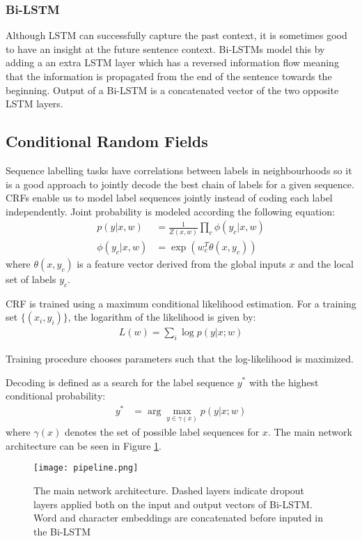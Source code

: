 \subsubsection{Bi-LSTM}
Although LSTM can successfully capture the past context, it is sometimes good
to have an insight at the future sentence context. Bi-LSTMs model
this by adding a an extra LSTM layer which has a reversed information flow
meaning that the information is propagated from the end of the sentence towards
the beginning. Output of a Bi-LSTM is a concatenated vector of the two opposite
LSTM layers.

\subsection{Conditional Random Fields}
Sequence labelling tasks have correlations between labels in neighbourhoods so
it is a good approach to jointly decode the best chain of labels for a given
sequence. CRFs enable us to model label sequences jointly instead of coding
each label independently. Joint probability is modeled according the following
equation:
\begin{align*}
    p(y | x, w) &= \frac{1}{Z(x, w)} \prod_c \phi(y_c | x, w)\\
    \phi(y_c | x, w) &= \exp(w_c^T \theta(x, y_c))
\end{align*}
where $\theta(x, y_c)$ is a feature vector derived from the global inputs $x$
and the local set of labels $y_c$.

CRF is trained using a maximum conditional likelihood estimation. For a
training set $\{(x_i, y_i)\}$, the logarithm of the likelihood is given by:
\begin{align*}
    L(w) = \sum_i \log p(y | x; w)
\end{align*}

Training procedure chooses parameters such that the log-likelihood is
maximized.

Decoding is defined as a search for the label sequence $y^*$ with the highest
conditional probability:
\begin{align*}
    y^* &= \arg\max\limits_{y \in \gamma(x)} p(y | x; w)
\end{align*}
where $\gamma(x)$ denotes the set of possible label sequences for $x$.
The main network architecture can be seen in Figure \ref{fig:pipeline}.

\begin{figure}
  \caption{The main network architecture. Dashed layers indicate dropout layers
  applied both on the input and output vectors of Bi-LSTM. Word and character
  embeddings are concatenated before inputed in the Bi-LSTM}
  \label{fig:pipeline}
  \centering
    \texttt{[image: pipeline.png]}
\end{figure}

